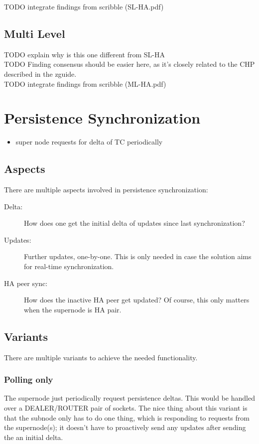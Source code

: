 TODO integrate findings from scribble (SL-HA.pdf)

\subsection{Multi Level}
TODO explain why is this one different from SL-HA\\
TODO Finding consensus should be easier here, as it's closely related to the CHP described in the zguide.\\
TODO integrate findings from scribble (ML-HA.pdf)

\section{Persistence Synchronization}\label{sec:meth:psync}
\begin{itemize}
	\item super node requests for delta of TC periodically
\end{itemize}

\subsection{Aspects}

There are multiple aspects involved in persistence synchronization:

\begin{description}
	\item [Delta:]
		How does one get the initial delta of updates since last
		synchronization?

	\item [Updates:]
		Further updates, one-by-one. This is only needed in
		case the solution aims for real-time synchronization.

	\item [HA peer sync:]
		How does the inactive HA peer get updated? Of
		course, this only matters when the supernode is HA pair.
\end{description}

\subsection{Variants}

There are multiple variants to achieve the needed functionality.

\subsubsection{Polling only}
The supernode just periodically request persistence
deltas. This would be handled over a DEALER/ROUTER pair of sockets. The nice
thing about this variant is that the subnode only has to do one thing, which is
responding to requests from the supernode(s); it doesn't have to proactively
send any updates after sending the an initial delta.

